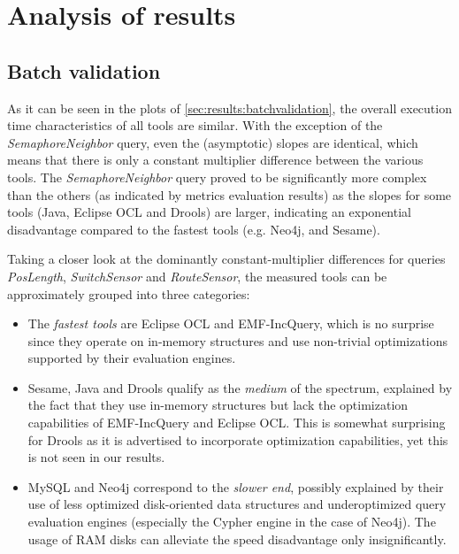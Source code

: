 \section{Analysis of results}
\label{sec:results:analysis}

\subsection{Batch validation}

% 

As it can be seen in the plots of \autoref{sec:results:batchvalidation}, the overall execution time characteristics of all tools are similar. With the exception of the \emph{SemaphoreNeighbor} query, even the (asymptotic) slopes are identical, which means that there is only a constant multiplier difference between the various tools. The \emph{SemaphoreNeighbor} query proved to be significantly more complex than the others (as indicated by metrics evaluation results) as the slopes for some tools (Java, Eclipse OCL and Drools) are larger, indicating an exponential disadvantage compared to the fastest tools (e.g. Neo4j, \eiq{} and Sesame).

Taking a closer look at the dominantly constant-multiplier differences for queries \emph{PosLength}, \emph{SwitchSensor} and \emph{RouteSensor}, the measured tools can be approximately grouped into three categories:
\begin{itemize}
  \item The \emph{fastest tools} are Eclipse OCL and EMF-IncQuery, which is no surprise since they operate on in-memory structures and use non-trivial optimizations supported by their evaluation engines.
  \item Sesame, Java and Drools qualify as the \emph{medium} of the spectrum, explained by the fact that they use in-memory structures but lack the optimization capabilities of EMF-IncQuery and Eclipse OCL. This is somewhat surprising for Drools as it is advertised to incorporate optimization capabilities, yet this is not seen in our results.
  \item MySQL and Neo4j correspond to the \emph{slower end}, possibly explained by their use of less optimized disk-oriented data structures and underoptimized query evaluation engines (especially the Cypher engine in the case of Neo4j). The usage of RAM disks can alleviate the speed disadvantage only insignificantly.
\end{itemize}

